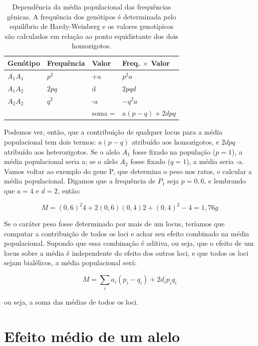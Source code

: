 \documentclass[portuges,]{tufte-handout}
\begin{document}
\begin{table}
  \centering
  \selectfont
  \caption{Dependência da média populacional das frequências
gênicas. A frequência dos genótipos é determinada pelo equilíbrio
de Hardy-Weinberg e os valores genotípicos são calculados em relação
ao ponto equidistante dos dois homozigotos.}
  \begin{tabular}{llll}
    \toprule
  Genótipo  &  Frequência   &  Valor   &   Freq. $\times$ Valor \\
    \midrule
 $A_1A_1$   &       $p^2$   &        +a &        $p^2a$ \\
 $A_1A_2$   &       $2pq$   &         d &        $2pqd$ \\
 $A_2A_2$   &       $q^2$   &        -a &        $-q^2a$ \\
            &               &   soma =  &   $a(p-q)+2dpq$ \\
    \bottomrule
  \end{tabular}
\end{table}

Podemos ver, então, que a contribuição de qualquer locus para a média
populacional tem dois termos: \(a(p-q)\) atribuído aos homozigotos, e
\(2dpq\) atribuído aos heterozigotos. Se o alelo \(A_1\) fosse fixado na
população (\(p = 1\)), a média populacional seria a; se o alelo \(A_2\)
fosse fixado (\(q = 1\)), a média seria -a. Vamos voltar ao exemplo do
gene P, que determina o peso nos ratos, e calcular a média populacional.
Digamos que a frequência de \(P_1\) seja \(p = 0,6\), e lembrando que
\(a = 4\) e \(d = 2\), então:

\[
M = (0,6)^2 4 + 2(0,6)(0,4) 2 + (0,4)^2 -4 = 1,76g
\]

Se o caráter peso fosse determinado por mais de um locus, teríamos que
computar a contribuição de todos os loci e achar seu efeito combinado na
média populacional. Supondo que essa combinação é aditiva, ou seja, que
o efeito de um locus sobre a média é independente do efeito dos outros
loci, e que todos os loci sejam bialélicos, a média populacional será:

\[
M = \sum_{i}a_i(p_i-q_i) + 2d_ip_iq_i
\]

ou seja, a soma das médias de todos os loci.

\section{Efeito médio de um alelo}\label{efeito-muxe9dio-de-um-alelo}
\end{document}
